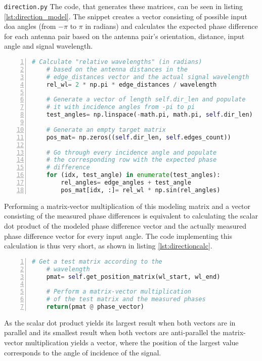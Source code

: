 \begin{subchapter}{\texttt{direction.py}}
  The code, that generates these matrices, can be seen in
  listing \ref{lst:direction_model}.
  The snippet creates a vector consisting of possible input
  \acrlong{doa} angles (from $-\pi$ to $\pi$ in radians)
  and calculates the expected phase difference for each
  antenna pair based on the antenna pair's orientation,
  distance, input angle and signal wavelength.

  \begin{lstlisting}[language=Python, frame=single,
      numbers=left, label={lst:direction_model},
      caption={Code fragment that calculates the receiver model}]
    # Calculate "relative wavelengths" (in radians)
    # based on the antenna distances in the
    # edge_distances vector and the actual signal wavelength
    rel_wl= 2 * np.pi * edge_distances / wavelength

    # Generate a vector of length self.dir_len and populate
    # it with incidence angles from -pi to pi
    test_angles= np.linspace(-math.pi, math.pi, self.dir_len)

    # Generate an empty target matrix
    pos_mat= np.zeros((self.dir_len, self.edges_count))

    # Go through every incidence angle and populate
    # the corresponding row with the expected phase
    # difference
    for (idx, test_angle) in enumerate(test_angles):
        rel_angles= edge_angles + test_angle
        pos_mat[idx, :]= rel_wl * np.sin(rel_angles)
  \end{lstlisting}

  \newpage

  Performing a matrix-vector multiplication of this modeling matrix
  and a vector consisting of the measured phase differences
  is equivalent to calculating the scalar dot product of the
  modeled phase difference vector and the actually measured
  phase difference vector for every input angle.
  The code implementing this calculation is
  thus very short, as shown in listing \ref{lst:directioncalc}. \\

  \begin{lstlisting}[language=Python, frame=single,
      numbers=left, label={lst:directioncalc},
      caption={Code fragment that calculates the \gls{doa} estimation}]
    # Get a test matrix according to the
    # wavelength
    pmat= self.get_position_matrix(wl_start, wl_end)

    # Perform a matrix-vector multiplication
    # of the test matrix and the measured phases
    return(pmat @ phase_vector)
  \end{lstlisting}

  As the scalar dot product yields its largest result
  when both vectors are in parallel and its smallest
  result when both vectors are anti-parallel the
  matrix-vector multiplication yields a vector, where
  the position of the largest value corresponds to the
  angle of incidence of the signal.
\end{subchapter}

